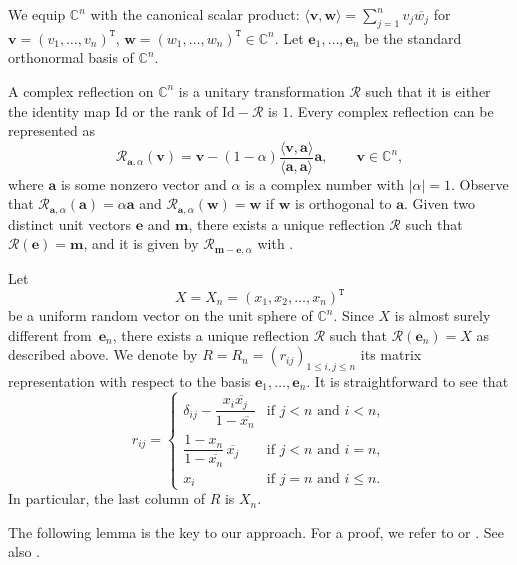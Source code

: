 \documentclass[pdftex]{sigma}
\numberwithin{equation}{section}
\theoremstyle{definition}
\newcommand{\trans}[1]{#1^{\mathtt{T}}}
\newcommand{\Refl}{\mathcal{R}}
\begin{document}
We equip $\mathbb{C}^n$ with the canonical scalar product: $\langle \bm{v},\bm{w} \rangle
=\sum_{j=1}^n v_j \overline{w_j}$ for $\bm{v}= \trans{(v_1,\dots,v_n)}$, $\bm{w}=\trans{(w_1,\dots,w_n)} \in \mathbb{C}^n$.
Let $\bm{e}_1,\dots, \bm{e}_n$ be the standard orthonormal basis of $\mathbb{C}^n$.

A complex reflection on $\mathbb{C}^n$ is a unitary transformation $\Refl$ such that it is either the identity map $\mathrm{Id}$ or the rank of $\mathrm{Id}-\Refl$ is $1$.
Every complex reflection can be represented as
\[
\Refl_{\bm{a},\alpha}( \bm{v})= \bm{v} - (1-\alpha) \frac{\langle \bm{v},\bm{a} \rangle}{\langle \bm{a},\bm{a} \rangle} \bm{a}, \qquad \bm{v} \in \mathbb{C}^n,
\]
where $\bm{a}$ is some nonzero vector and $\alpha$ is a complex number with $|\alpha|=1$.
 Observe that $\Refl_{\bm{a},\alpha}(\bm{a})= \alpha \bm{a}$ and
$\Refl_{\bm{a},\alpha}(\bm{w})= \bm{w}$ if $\bm{w}$ is orthogonal to $\bm{a}$.
Given two distinct unit vectors $\bm{e}$ and $\bm{m}$, there exists a unique reflection $\Refl$ such that
$\Refl(\bm{e})=\bm{m}$, and it is given by $\Refl_{\bm{m}-\bm{e},\alpha}$ with .

Let
\[
X=X_n =\trans{(x_1,x_2,\dots,x_n)}
\]
be a uniform random vector on the unit sphere of $\mathbb{C}^n$.
Since $X$ is almost surely different from~$\bm{e}_n$,
 there exists a unique reflection $\Refl$ such that
$\Refl(\bm{e}_n)=X$ as described above.
We denote by $R=R_n=(r_{ij})_{1 \le i,j \le n}$ its matrix representation with respect to the basis $\bm{e}_1,\dots, \bm{e}_n$.
It is straightforward to see that
\begin{equation} \label{matrixR}
r_{ij}= \begin{cases}
\delta_{ij}-\dfrac{x_{i}\overline{x_{j}}}{1-\overline{x_{n}}} &\text{if $j<n$ and $i <n$}, \\
\dfrac{1-x_{n}}{1-\overline{x_{n}}}\, \overline{x_{j}} &\text{if $j<n$ and $i=n$},\\
x_{i} & \text{if $j=n$ and $i \le n$}.
\end{cases}
\end{equation}
In particular, the last column of $R$ is $X_n$.

The following lemma is the key to our approach. For a proof, we refer to \cite[Proposition 3.1]{BNN} or \cite[Theorem 1]{BNR}.
See also \cite[Proposition 2.1]{BHNY}.
\end{document}
